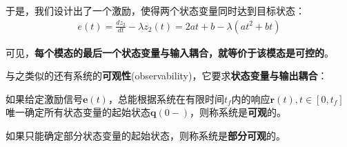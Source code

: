 \documentclass{ctexbook}
\begin{document}
\begin{example}
    于是，我们设计出了一个激励，使得两个状态变量同时达到目标状态：\begin{align*}
        e(t)=\frac{d z_2}{dt}-\lambda z_2(t)=2at+b-\lambda (a t^2+bt)
    \end{align*}
\end{example}

可见，\textbf{每个模态的最后一个状态变量与输入耦合，就等价于该模态是可控的}。

与之类似的还有系统的\textbf{可观性}(observability)，它要求\textbf{状态变量与输出耦合}：

\begin{definition}[可观性]
    如果给定激励信号$\mathbf{e}(t)$，总能根据系统在有限时间$t_f$内的响应$\mathbf{r}(t),t\in[0,t_f]$唯一确定所有状态变量的起始状态$\mathbf{q}(0-)$，则称系统是\textbf{可观}的。

    如果只能确定部分状态变量的起始状态，则称系统是\textbf{部分可观}的。
\end{definition}
\end{document}
